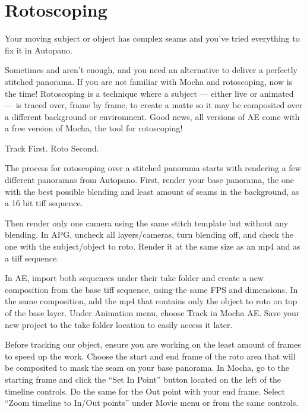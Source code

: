 \chapter{Rotoscoping}
\pagecolor{white}
\label{chap:50}
\begin{fullwidth}

\problem

{\large Your moving subject or object has complex seams and you’ve tried everything to fix it in Autopano. \par}

Sometimes \textbf{} and \textbf{} aren’t enough, and you need an alternative to deliver a perfectly stitched panorama. If you are not familiar with Mocha and rotoscoping, now is the time! Rotoscoping is a technique where a subject — either live or animated — is traced over, frame by frame, to create a matte so it may be composited over a different background or environment. Good news, all versions of AE come with a free version of Mocha, the tool for rotoscoping! 

\clearpage
\solution

{\large Track First. Roto Second. \par}

The process for rotoscoping over a stitched panorama starts with rendering a few different panoramas from Autopano. First, render your base panorama, the one with the best possible blending and least amount of seams in the background, as a 16 bit tiff sequence. 


Then render only one camera using the same stitch template but without any blending. In APG, uncheck all layers/cameras, turn blending off, and check the one with the subject/object to roto. Render it at the same size as an mp4 and as a tiff sequence.


In AE, import both sequences under their take folder and create a new composition from the base tiff sequence, using the same FPS and dimensions. In the same composition, add the mp4 that contains only the object to roto on top of the base layer. Under Animation menu, choose Track in Mocha AE. Save your new project to the take folder location to easily access it later. 


Before tracking our object, ensure you are working on the least amount of frames to speed up the work. Choose the start and end frame of the roto area that will be composited to mask the seam on your base panorama. In Mocha, go to the starting frame and click the “Set In Point” button located on the left of the timeline controls. Do the same for the Out point with your end frame. Select “Zoom timeline to In/Out points” under Movie menu or from the same controls.


\end{fullwidth}
